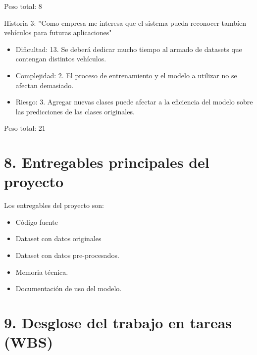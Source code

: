 \documentclass[
11pt, %
codirector, %
]{charter}
\begin{document}
Peso total: 8

Historia 3: ''Como empresa me interesa que el sistema pueda reconocer tambíen vehículos para futuras aplicaciones"

\begin{itemize}
	\item Dificultad: 13. Se deberá dedicar mucho tiempo al armado de datasets que contengan distintos vehículos.
	\item Complejidad: 2. El proceso de entrenamiento y el modelo a utilizar no se afectan demasiado.
	\item Riesgo: 3. Agregar nuevas clases puede afectar a la eficiencia del modelo sobre las predicciones de las clases originales.
\end{itemize}
	
Peso total: 21

\section{8. Entregables principales del proyecto}
\label{sec:entregables}

Los entregables del proyecto son:

\begin{itemize}
	\item Código fuente
	\item Dataset con datos originales
	\item Dataset con datos pre-procesados.
	\item Memoria técnica.
	\item Documentación de uso del modelo.
\end{itemize}


\section{9. Desglose del trabajo en tareas (WBS)}
\label{sec:wbs}
\end{document}
